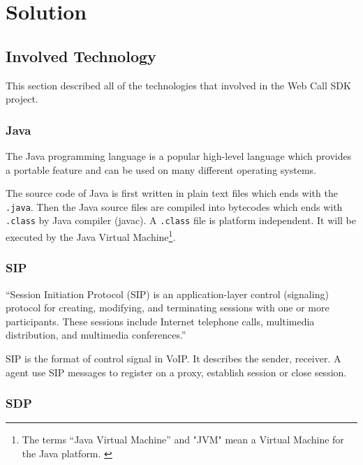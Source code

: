 \chapter{Solution}
\label{sec:Solution}

\section{Involved Technology}
\label{sec:Solution:InvolvedTechnology}

This section described all of the technologies that involved in the Web Call SDK project.

\subsection{Java}
\label{sec:Solution:InvolvedTechnology:Java}

The Java\texttrademark{} programming language is a popular high-level language which provides a portable feature and can be used on many different operating systems. 

The source code of Java is first written in plain text files which ends with the \nolinebreak\texttt{.java}. Then the Java source files are compiled into bytecodes which ends with \nolinebreak\texttt{.class} by Java compiler (javac). A \nolinebreak\texttt{.class} file is platform independent. It will be executed by the Java Virtual Machine\label{sym:JVM}\footnote{The terms ``Java Virtual Machine'' and "JVM" mean a Virtual Machine for the Java platform. \cite{TheJavaProgrammingLanguage}}.\cite{TheJavaProgrammingLanguage}

\subsection{SIP}
\label{sec:Solution:InvolvedTechnology:SIP}
\label{sym:SIP}

``Session Initiation Protocol (SIP) is an application-layer control (signaling) protocol for creating, modifying, and terminating sessions with one or more participants. These sessions include Internet telephone calls, multimedia distribution, and multimedia conferences.''\cite{RFC3261}

SIP is the format of control signal in VoIP. It describes the sender, receiver. A agent use SIP messages to register on a proxy, establish session or close session. 

\subsection{SDP}
\label{sec:Solution:InvolvedTechnology:SDP}
\label{sym:SDP}

